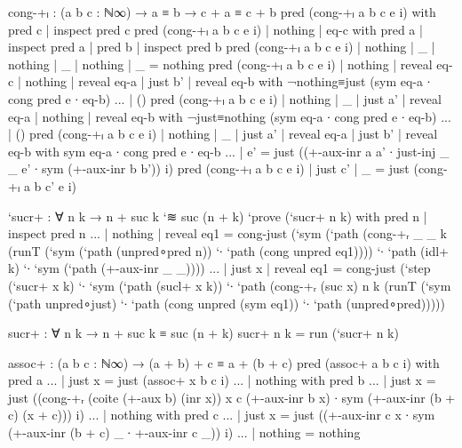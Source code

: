 \begin{code}[hide]
cong-+ₗ : (a b c : ℕ∞) → a ≡ b → c + a ≡ c + b
pred (cong-+ₗ a b c e i) with pred c | inspect pred c
pred (cong-+ₗ a b c e i) | nothing | eq-c with pred a | inspect pred a | pred b | inspect pred b
pred (cong-+ₗ a b c e i) | nothing | _           | nothing | _           | nothing | _ = nothing
pred (cong-+ₗ a b c e i) | nothing | reveal eq-c | nothing | reveal eq-a | just b' | reveal eq-b with ¬nothing≡just (sym eq-a ∙ cong pred e ∙ eq-b)
... | ()
pred (cong-+ₗ a b c e i) | nothing | _ | just a' | reveal eq-a | nothing | reveal eq-b with ¬just≡nothing (sym eq-a ∙ cong pred e ∙ eq-b)
... | ()
pred (cong-+ₗ a b c e i) | nothing | _ | just a' | reveal eq-a | just b' | reveal eq-b with sym eq-a ∙ cong pred e ∙ eq-b
... | e' = just ((+-aux-inr a a' ∙ just-inj _ _ e' ∙ sym (+-aux-inr b b')) i)
pred (cong-+ₗ a b c e i) | just c' | _ = just (cong-+ₗ a b c' e i)

`sucr+ : ∀ n k → n + suc k `≋ suc (n + k)
`prove (`sucr+ n k) with pred n | inspect pred n
... | nothing | reveal eq1 = cong-just (`sym (`path (cong-+ᵣ _ _ k (runT (`sym (`path (unpred∘pred {n})) `∙ `path (cong unpred eq1)))) `∙ `path (idl+ k) `∙ `sym (`path (+-aux-inr _ _))))
... | just x  | reveal eq1 = cong-just (`step (`sucr+ x k) `∙ `sym (`path (sucl+ x k)) `∙ `path (cong-+ᵣ (suc x) n k (runT (`sym (`path unpred∘just) `∙ `path (cong unpred (sym eq1)) `∙ `path (unpred∘pred)))))

sucr+ : ∀ n k → n + suc k ≡ suc (n + k)
sucr+ n k = run (`sucr+ n k)

assoc+ : (a b c : ℕ∞) → (a + b) + c ≡ a + (b + c)
pred (assoc+ a b c i) with pred a
... | just x = just (assoc+ x b c i)
... | nothing with pred b
... | just x = just ((cong-+ᵣ (coite (+-aux b) (inr x)) x c (+-aux-inr b x) ∙ sym (+-aux-inr (b + c) (x + c))) i)
... | nothing with pred c
... | just x = just ((+-aux-inr c x ∙ sym (+-aux-inr (b + c) _ ∙ +-aux-inr c _)) i)
... | nothing = nothing


\end{code}
